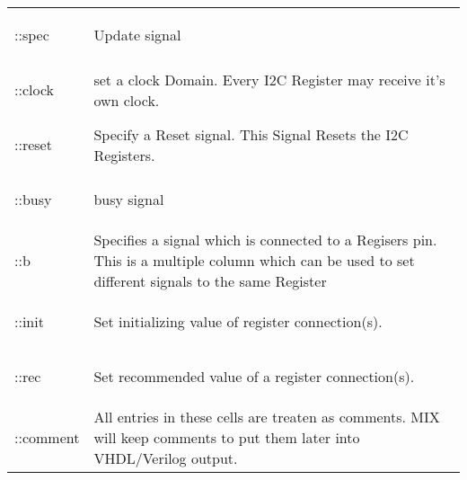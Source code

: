 \documentclass[a4paper,12pt]{report}
\begin{document}
\begin{tabular}{lp{14cm}}
  \begin{bf}::spec\end{bf} & Update signal\\
  \begin{bf}::clock\end{bf} & set a clock Domain. Every I2C Register may receive it's own clock.\\
  \begin{bf}::reset\end{bf} & Specify a Reset signal. This Signal Resets the I2C Registers.\\
  \begin{bf}::busy\end{bf} & busy signal\\
  \begin{bf}::b\end{bf} & Specifies a signal which is connected to a Regisers pin. This is a multiple column which can be used to set different signals to the same Register\\
  \begin{bf}::init\end{bf} & Set initializing value of register connection(s).\\
  \begin{bf}::rec\end{bf} & Set recommended value of a register connection(s).\\
  \begin{bf}::comment\end{bf} & All entries in these cells are treaten as comments. MIX will keep comments to put them later into VHDL/Verilog output.\\
\end{tabular}
\end{document}
